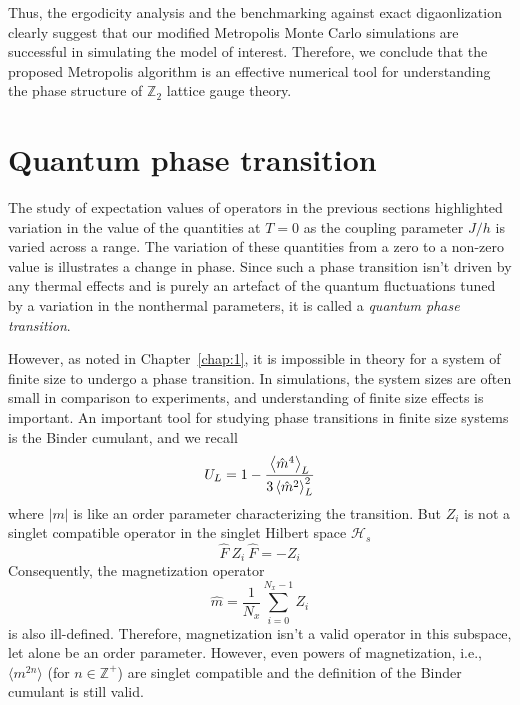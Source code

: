 \documentclass[../thesis_main.tex]{subfiles}
\begin{document}
Thus, the ergodicity analysis and the benchmarking against exact digaonlization clearly suggest that our modified Metropolis Monte Carlo simulations are successful in simulating the model of interest. Therefore, we conclude that the proposed Metropolis algorithm is an effective numerical tool for understanding the phase structure of $\mathbb{Z}_2$ lattice gauge theory.

\section{Quantum phase transition}
The study of expectation values of operators in the previous sections highlighted variation in the value of the quantities at $T = 0$ as the coupling parameter $J/h$ is varied across a range. The variation of these quantities from a zero to a non-zero value is illustrates a change in phase. Since such a phase transition isn't driven by any thermal effects and is purely an artefact of the quantum fluctuations tuned by a variation in the nonthermal parameters, it is called a \textit{quantum phase transition}.

However, as noted in Chapter~\ref{chap:1}, it is impossible in theory for a system of finite size to undergo a phase transition. In simulations, the system sizes are often small in comparison to experiments, and understanding of finite size effects is important. An important tool for studying phase transitions in finite size systems is the Binder cumulant, and we recall
\begin{equation}
    U_L = 1 - \frac{\expval{\hat{m}^4}_L}{3\expval{\hat{m}^2}^2_L}
\end{equation}
where $|m|$ is like an order parameter characterizing the transition. But $Z_i$ is not a singlet compatible operator in the singlet Hilbert space $\mathcal{H}_s$
\begin{equation}
    \hat{F} \: Z_i \: \hat{F} = - Z_i
\end{equation}
Consequently, the magnetization operator
\begin{equation}
    \hat{m} = \frac{1}{N_x} \sum_{i=0}^{N_x-1} Z_i
\end{equation}
is also ill-defined. Therefore, magnetization isn't a valid operator in this subspace, let alone be an order parameter. However, even powers of magnetization, i.e., $\langle m^{2n} \rangle$ (for $n \in \mathbb{Z}^+$) are singlet compatible and the definition of the Binder cumulant is still valid.
\end{document}
